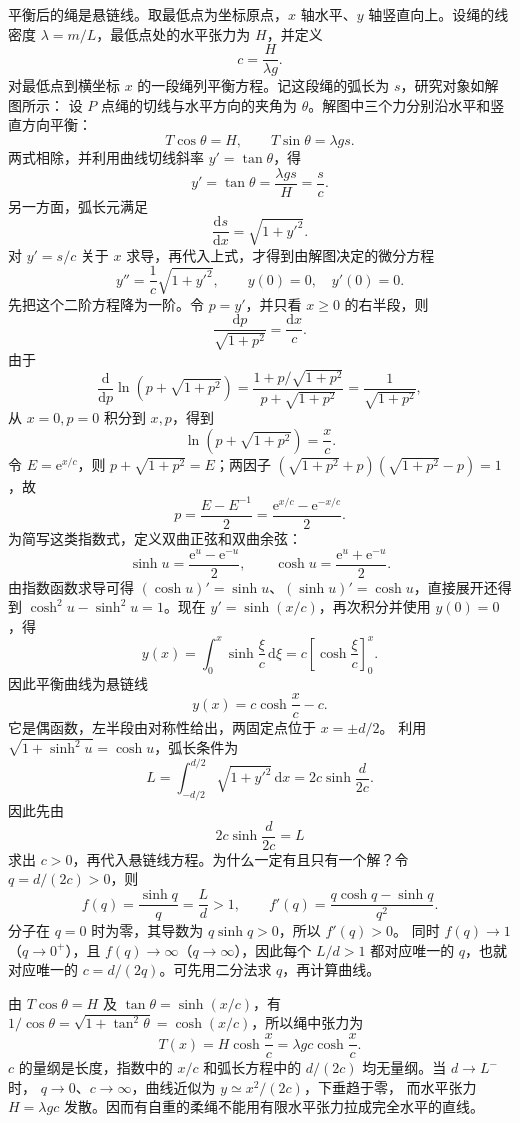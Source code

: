 {\begin{xesolution}
平衡后的绳是悬链线。取最低点为坐标原点，$x$ 轴水平、$y$ 轴竖直向上。设绳的线密度
$\lambda=m/L$，最低点处的水平张力为 $H$，并定义
\[
  c=\frac{H}{\lambda g}.
\]
对最低点到横坐标 $x$ 的一段绳列平衡方程。记这段绳的弧长为 $s$，研究对象如解图所示：
\soldiagOneTwentySeven
设 $P$ 点绳的切线与水平方向的夹角为 $\theta$。解图中三个力分别沿水平和竖直方向平衡：
\[
  T\cos\theta=H,
  \qquad
  T\sin\theta=\lambda gs.
\]
两式相除，并利用曲线切线斜率 $y'=\tan\theta$，得
\[
  y'=\tan\theta=\frac{\lambda gs}{H}=\frac{s}{c}.
\]
另一方面，弧长元满足
\[
  \frac{\mathrm ds}{\mathrm dx}=\sqrt{1+y'^2}.
\]
对 $y'=s/c$ 关于 $x$ 求导，再代入上式，才得到由解图决定的微分方程
\[
  y''=\frac{1}{c}\sqrt{1+y'^2},
  \qquad y(0)=0,\quad y'(0)=0.
\]
先把这个二阶方程降为一阶。令 $p=y'$，并只看 $x\ge0$ 的右半段，则
\[
 \frac{\mathrm dp}{\sqrt{1+p^2}}=\frac{\mathrm dx}{c}.
\]
由于
\[
 \frac{\mathrm d}{\mathrm dp}\ln\!\left(p+\sqrt{1+p^2}\right)
 =\frac{1+p/\sqrt{1+p^2}}{p+\sqrt{1+p^2}}
 =\frac1{\sqrt{1+p^2}},
\]
从 $x=0,p=0$ 积分到 $x,p$，得到
\[
 \ln\!\left(p+\sqrt{1+p^2}\right)=\frac xc.
\]
令 $E=\mathrm e^{x/c}$，则 $p+\sqrt{1+p^2}=E$；两因子
$(\sqrt{1+p^2}+p)(\sqrt{1+p^2}-p)=1$，故
\[
 p=\frac{E-E^{-1}}2=\frac{\mathrm e^{x/c}-\mathrm e^{-x/c}}2.
\]
为简写这类指数式，定义双曲正弦和双曲余弦：
\[
 \sinh u=\frac{\mathrm e^u-\mathrm e^{-u}}2,\qquad
 \cosh u=\frac{\mathrm e^u+\mathrm e^{-u}}2.
\]
由指数函数求导可得 $(\cosh u)'=\sinh u$、$(\sinh u)'=\cosh u$，直接展开还得到
$\cosh^2u-\sinh^2u=1$。现在 $y'=\sinh(x/c)$，再次积分并使用 $y(0)=0$，得
\[
 y(x)=\int_0^x\sinh\frac{\xi}{c}\,\mathrm d\xi
 =c\left[\cosh\frac{\xi}{c}\right]_0^x.
\]
因此平衡曲线为悬链线
\[
  \boxed{y(x)=c\cosh\frac{x}{c}-c}.
\]
它是偶函数，左半段由对称性给出，两固定点位于 $x=\pm d/2$。
利用 $\sqrt{1+\sinh^2u}=\cosh u$，弧长条件为
\[
  L=\int_{-d/2}^{d/2}\sqrt{1+y'^2}\,\mathrm dx
  =2c\sinh\frac{d}{2c}.
\]
因此先由
\[
  \boxed{2c\sinh\frac{d}{2c}=L}
\]
求出 $c>0$，再代入悬链线方程。为什么一定有且只有一个解？令 $q=d/(2c)>0$，则
\[
 f(q)=\frac{\sinh q}{q}=\frac Ld>1,\qquad
 f'(q)=\frac{q\cosh q-\sinh q}{q^2}.
\]
分子在 $q=0$ 时为零，其导数为 $q\sinh q>0$，所以 $f'(q)>0$。
同时 $f(q)\to1$（$q\to0^+$），且 $f(q)\to\infty$（$q\to\infty$），因此每个 $L/d>1$
都对应唯一的 $q$，也就对应唯一的 $c=d/(2q)$。可先用二分法求 $q$，再计算曲线。

由 $T\cos\theta=H$ 及 $\tan\theta=\sinh(x/c)$，有
$1/\cos\theta=\sqrt{1+\tan^2\theta}=\cosh(x/c)$，所以绳中张力为
\[
  T(x)=H\cosh\frac{x}{c}=\lambda gc\cosh\frac{x}{c}.
\]
$c$ 的量纲是长度，指数中的 $x/c$ 和弧长方程中的 $d/(2c)$ 均无量纲。当 $d\to L^-$ 时，
$q\to0$、$c\to\infty$，曲线近似为 $y\simeq x^2/(2c)$，下垂趋于零，
而水平张力 $H=\lambda gc$ 发散。因而有自重的柔绳不能用有限水平张力拉成完全水平的直线。
\end{xesolution}

}
